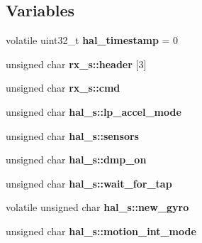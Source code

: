 \subsection*{Variables}
\begin{DoxyCompactItemize}
\item 
\hypertarget{group__e_m_p_l_ga359d30cf3d94f8046df41f14467c36de}{}volatile uint32\+\_\+t {\bfseries hal\+\_\+timestamp} = 0\label{group__e_m_p_l_ga359d30cf3d94f8046df41f14467c36de}

\item 
\hypertarget{group__e_m_p_l_ga56962a58a26d80a33025ef500242f51b}{}unsigned char {\bfseries rx\+\_\+s\+::header} \mbox{[}3\mbox{]}\label{group__e_m_p_l_ga56962a58a26d80a33025ef500242f51b}

\item 
\hypertarget{group__e_m_p_l_gaefa1a9bddf56e4d6c5ee8ff3f2175b01}{}unsigned char {\bfseries rx\+\_\+s\+::cmd}\label{group__e_m_p_l_gaefa1a9bddf56e4d6c5ee8ff3f2175b01}

\item 
\hypertarget{group__e_m_p_l_ga2495005d08cae39a0c73412eef93fa96}{}unsigned char {\bfseries hal\+\_\+s\+::lp\+\_\+accel\+\_\+mode}\label{group__e_m_p_l_ga2495005d08cae39a0c73412eef93fa96}

\item 
\hypertarget{group__e_m_p_l_ga6993a0da4e0eb964d49fb309066b1835}{}unsigned char {\bfseries hal\+\_\+s\+::sensors}\label{group__e_m_p_l_ga6993a0da4e0eb964d49fb309066b1835}

\item 
\hypertarget{group__e_m_p_l_ga74fc0678cdb732ca77b8bfe8c8fb00df}{}unsigned char {\bfseries hal\+\_\+s\+::dmp\+\_\+on}\label{group__e_m_p_l_ga74fc0678cdb732ca77b8bfe8c8fb00df}

\item 
\hypertarget{group__e_m_p_l_gac5d6826bbae4a543f9e4bac6e9da755d}{}unsigned char {\bfseries hal\+\_\+s\+::wait\+\_\+for\+\_\+tap}\label{group__e_m_p_l_gac5d6826bbae4a543f9e4bac6e9da755d}

\item 
\hypertarget{group__e_m_p_l_gad26aab5f2b7bb0c9d115e8cb6c7f91ba}{}volatile unsigned char {\bfseries hal\+\_\+s\+::new\+\_\+gyro}\label{group__e_m_p_l_gad26aab5f2b7bb0c9d115e8cb6c7f91ba}

\item 
\hypertarget{group__e_m_p_l_ga1cbe790c552b9d5b2097c122ef91362e}{}unsigned char {\bfseries hal\+\_\+s\+::motion\+\_\+int\+\_\+mode}\label{group__e_m_p_l_ga1cbe790c552b9d5b2097c122ef91362e}


\end{DoxyCompactItemize}
